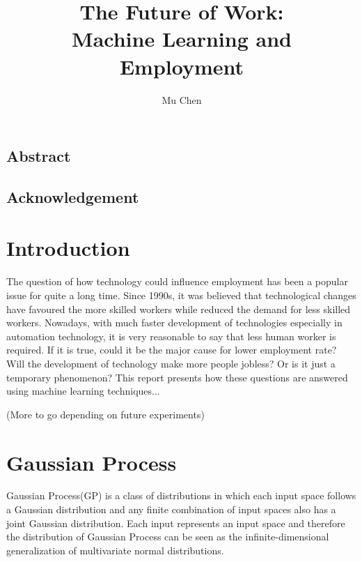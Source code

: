 \documentclass[14pt]{report}
\title{The Future of Work: \\ Machine Learning and Employment}
\author{Mu Chen}
\numberwithin{equation}{chapter}
\begin{document}
\newpage
\maketitle
\section*{Abstract}

\newpage
\section*{Acknowledgement}

\newpage 
{}
\lhead{} 
 
\tableofcontents

\begin{spacing}{2}

\newpage
{}
\setcounter{page}{1}



\chapter{Introduction}
The question of how technology could influence employment has been a popular issue for quite a long time\cite{machin1998}. Since 1990s, it was believed that technological changes have favoured the more skilled workers while reduced the demand for less skilled workers\cite{bound1989changes}. Nowadays, with much faster development of technologies especially in automation technology, it is very reasonable to say that less human worker is required. If it is true, could it be the major cause for lower employment rate? Will the development of technology make more people jobless? Or is it just a temporary phenomenon? This report presents how these questions are answered using machine learning techniques...

(More to go depending on future experiments)



\newpage
\chapter{Gaussian Process}
Gaussian Process(GP) is a class of distributions in which each input space follows a Gaussian distribution and any finite combination of input spaces also has a joint Gaussian distribution. Each input represents an input space and therefore the distribution of Gaussian Process can be seen as the infinite-dimensional generalization of multivariate normal distributions. 


\end{spacing}
\end{document}
